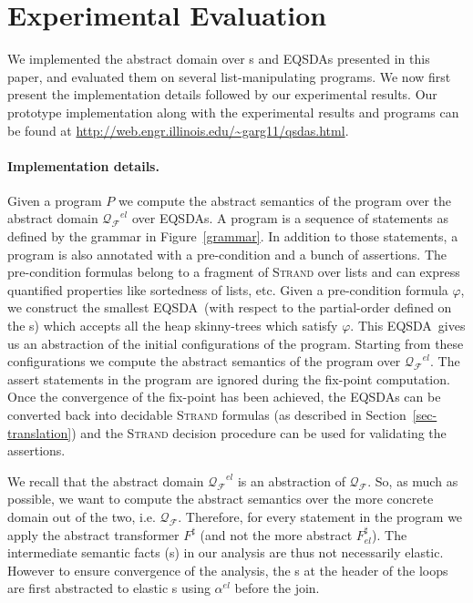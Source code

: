 \documentclass{llncs}
\newcommand{\Strand}{\textsc{Strand}\xspace}
\newcommand{\EQSDA}{\mbox{\sc EQSDA}}
\begin{document}
\section{Experimental Evaluation}


We implemented the abstract domain over \QSDA s and \EQSDA s presented in this paper, and evaluated them on several list-manipulating programs. We now first present the implementation details followed by our experimental results.
Our prototype implementation along with the experimental results and programs can be found at \url{http://web.engr.illinois.edu/~garg11/qsdas.html}.




\paragraph{\bf Implementation details.}
Given a program $P$ we compute the abstract semantics of the program over the abstract domain $\mathcal{Q_F}^{el}$ over \EQSDA s.
A program is a sequence of statements as defined by the grammar in Figure~\ref{grammar}. In addition to those statements, a program is also annotated with a pre-condition and a bunch of assertions.
The pre-condition formulas belong to a fragment of \Strand over lists and can express quantified properties like sortedness of lists, etc. Given a pre-condition formula $\varphi$, we construct the smallest \EQSDA\ (with respect to the partial-order defined on the \QSDA s) which accepts all the heap skinny-trees which satisfy $\varphi$.
This \EQSDA\ gives us an abstraction of the initial configurations of the program. Starting from these configurations we compute the abstract semantics of the program over $\mathcal{Q_F}^{el}$. The assert statements in the program are ignored during the fix-point computation. Once the convergence of the fix-point has been achieved, the \EQSDA s can be converted back into decidable \Strand formulas (as described in Section~\ref{sec-translation}) and the \Strand decision procedure can be used for validating the assertions.

We recall that the abstract domain $\mathcal{Q_F}^{el}$ is an abstraction of $\mathcal{Q_F}$. So, as much as possible, we want to compute the abstract semantics over the more concrete domain out of the two, i.e. $\mathcal{Q_F}$.
Therefore, for every statement in the program we apply the abstract transformer $F^\sharp$  (and not the more abstract $F_{el}^\sharp$). The intermediate semantic facts (\QSDA s) in our analysis are thus not necessarily elastic.
However to ensure convergence of the analysis, the \QSDA s at the header of the loops are first abstracted to elastic \QSDA s using $\alpha^{el}$ before the join.
\end{document}
